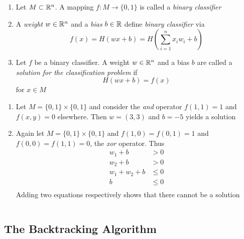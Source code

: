 \begin{definition}\hfill
    \begin{enumerate}
		\item Let \( M \subset \mathbb{R}^n \). A mapping \( f: M \to \{ 0, 1 \} \) is called a \emph{binary classifier} 
		\item A \emph{weight} \( w \in \mathbb{R}^n \) and a \emph{bias} \( b \in \mathbb{R} \) define \emph{binary classifier} via
			\[
				f(x) = H(wx + b) = H(\sum_{i=1}^n x_i w_i + b)
			\]
		\item Let \( f \) be a binary classifier. A weight \( w \in \mathbb{R}^n \) and a bias \( b \) are called a
			\emph{solution for the classification problem} if 
				\[
					H(wx + b) = f(x)
				\]
			for \( x \in M \)
    \end{enumerate}
\end{definition}
\bigskip


\begin{examples}\hfill
    \begin{enumerate}
        \item Let \( M = \{ 0, 1 \} \times \{ 0, 1 \} \) and consider the \emph{and} operator 
		    \( f(1, 1) = 1 \) and \( f(x, y) = 0 \) elsewhere. Then \( w = (3, 3) \) and \( b = -5 \) 
			yields a solution
        \item Again let \( M = \{ 0, 1 \} \times \{ 0, 1 \} \) and \( f(1, 0) = f(0, 1) = 1 \) and 
			\( f(0, 0) = f(1, 1) = 0 \), the \emph{xor} operator. Thus
				\[
					\begin{split}
						w_1 + b & > 0 \\
						w_2 + b & > 0 \\
						w_1 + w_2 + b & \le 0 \\
						b & \le 0 \\
					\end{split}
				\]
			Adding two equations respectively shows that there cannot be a solution
	\end{enumerate}
\end{examples}
\bigskip


\begin{algorithm}[Perceptron]\label{algo:perceptron}
\end{algorithm}
\inputminted[fontsize=\small, framesep=0.35cm, frame=lines, python3=true]{python}{python/perceptron.py}
\bigskip


\subsection{The Backtracking Algorithm}


